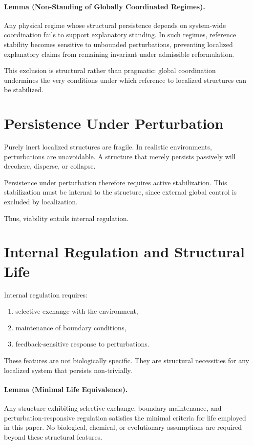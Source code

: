 \documentclass[11pt]{article}
\begin{document}
\paragraph{Lemma (Non-Standing of Globally Coordinated Regimes).}
Any physical regime whose structural persistence depends on system-wide coordination fails to support explanatory standing. In such regimes, reference stability becomes sensitive to unbounded perturbations, preventing localized explanatory claims from remaining invariant under admissible reformulation.

This exclusion is structural rather than pragmatic: global coordination undermines the very conditions under which reference to localized structures can be stabilized.

\section{Persistence Under Perturbation}

Purely inert localized structures are fragile. In realistic environments, perturbations are unavoidable. A structure that merely persists passively will decohere, disperse, or collapse.

Persistence under perturbation therefore requires active stabilization. This stabilization must be internal to the structure, since external global control is excluded by localization.

Thus, viability entails internal regulation.

\section{Internal Regulation and Structural Life}

Internal regulation requires:
\begin{enumerate}[leftmargin=2em]
\item selective exchange with the environment,
\item maintenance of boundary conditions,
\item feedback-sensitive response to perturbations.
\end{enumerate}

These features are not biologically specific. They are structural necessities for any localized system that persists non-trivially.

\paragraph{Lemma (Minimal Life Equivalence).}
Any structure exhibiting selective exchange, boundary maintenance, and perturbation-responsive regulation satisfies the minimal criteria for life employed in this paper. No biological, chemical, or evolutionary assumptions are required beyond these structural features.
\end{document}
